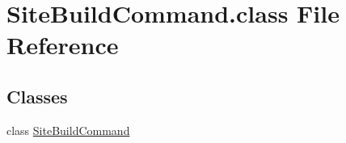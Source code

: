 \hypertarget{SiteBuildCommand_8class}{\section{Site\-Build\-Command.\-class File Reference}
\label{SiteBuildCommand_8class}
}
\subsection*{Classes}
\begin{DoxyCompactItemize}
\item 
class \hyperlink{classSiteBuildCommand}{Site\-Build\-Command}
\end{DoxyCompactItemize}
